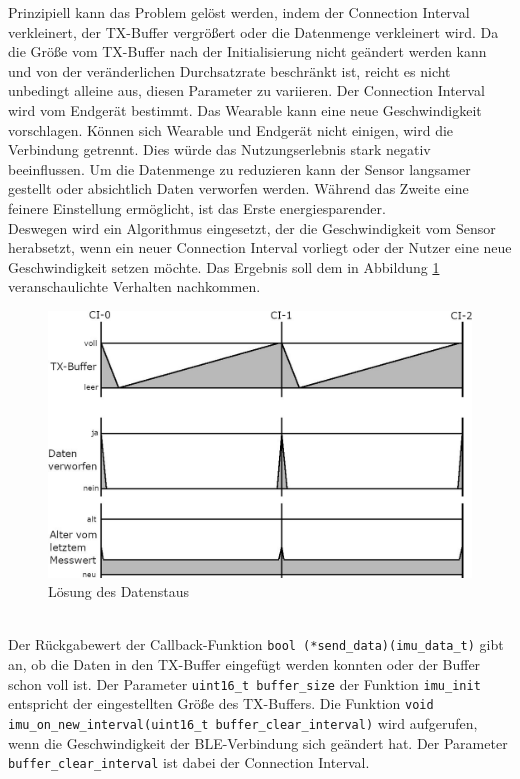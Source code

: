 Prinzipiell kann das Problem gelöst werden, indem der Connection Interval verkleinert, der TX-Buffer vergrößert oder die Datenmenge verkleinert wird.
Da die Größe vom TX-Buffer nach der Initialisierung nicht geändert werden kann und von der veränderlichen Durchsatzrate beschränkt ist, reicht es nicht unbedingt alleine aus, diesen Parameter zu variieren.
Der Connection Interval wird vom Endgerät bestimmt.
Das Wearable kann eine neue Geschwindigkeit vorschlagen.
Können sich Wearable und Endgerät nicht einigen, wird die Verbindung getrennt.
Dies würde das Nutzungserlebnis stark negativ beeinflussen.
Um die Datenmenge zu reduzieren kann der Sensor langsamer gestellt oder absichtlich Daten verworfen werden.
Während das Zweite eine feinere Einstellung ermöglicht, ist das Erste energiesparender.\\
Deswegen wird ein Algorithmus eingesetzt, der die Geschwindigkeit vom Sensor herabsetzt, wenn ein neuer Connection Interval vorliegt oder der Nutzer eine neue Geschwindigkeit setzen möchte.
Das Ergebnis soll dem in Abbildung \ref{fig:daten_nachher} veranschaulichte Verhalten nachkommen.
\begin{figure}[h]
	\centering
	\includegraphics[width=0.8\linewidth]{res/datenNachher.jpg}
	\caption{Lösung des Datenstaus}
	\label{fig:daten_nachher}
\end{figure}\\
Der Rückgabewert der Callback-Funktion \texttt{bool (*send\_data)(imu\_data\_t)} gibt an, ob die Daten in den TX-Buffer eingefügt werden konnten oder der Buffer schon voll ist.
Der Parameter \texttt{uint16\_t buffer\_size} der Funktion \texttt{imu\_init} entspricht der eingestellten Größe des TX-Buffers.
Die Funktion \texttt{void imu\_on\_new\_interval(\allowbreak{}uint16\_t buffer\_clear\_interval)} wird aufgerufen, wenn die Geschwindigkeit der BLE-Verbindung sich geändert hat.
Der Parameter \texttt{buffer\_clear\_interval} ist dabei der Connection Interval.
